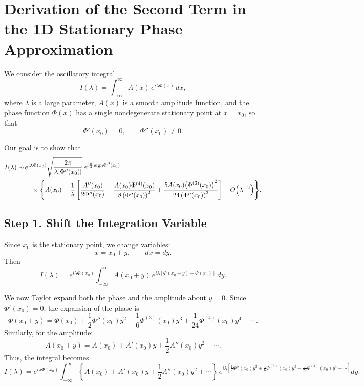 \documentclass[11pt]{article}
\begin{document}
\section*{Derivation of the Second Term in the 1D Stationary Phase Approximation}

We consider the oscillatory integral
\begin{equation}\label{I_def}
I(\lambda)=\int_{-\infty}^\infty A(x)\,e^{i\lambda\Phi(x)}\,dx,
\end{equation}
where $\lambda$ is a large parameter, $A(x)$ is a smooth amplitude function, and the phase function $\Phi(x)$ has a single nondegenerate stationary point at $x=x_0$, so that
\[
\Phi'(x_0)=0,\qquad \Phi''(x_0)\neq 0.
\]

Our goal is to show that
\begin{equation}\label{result}
\begin{split}
I(\lambda)\sim\, & e^{i\lambda\Phi(x_0)}\sqrt{\frac{2\pi}{\lambda|\Phi''(x_0)|}}\,e^{i\frac{\pi}{4}\,\text{sign}\Phi''(x_0)} \\
&\quad \times \Biggl\{ A(x_0) + \frac{1}{\lambda}\left[\frac{A''(x_0)}{2\Phi''(x_0)}
-\frac{A(x_0)\Phi^{(4)}(x_0)}{8\left(\Phi''(x_0)\right)^2}+\frac{5A(x_0)\bigl(\Phi^{(3)}(x_0)\bigr)^2}{24\left(\Phi''(x_0)\right)^3}\right] + O\Bigl(\lambda^{-2}\Bigr) \Biggr\}.
\end{split}
\end{equation}

\subsection*{Step 1. Shift the Integration Variable}

Since $x_0$ is the stationary point, we change variables:
\[
x=x_0+y,\qquad dx=dy.
\]
Then
\[
I(\lambda)=e^{i\lambda\Phi(x_0)}\int_{-\infty}^{\infty} A(x_0+y)\, e^{i\lambda\left[\Phi(x_0+y)-\Phi(x_0)\right]}\,dy.
\]

We now Taylor expand both the phase and the amplitude about $y=0$. Since $\Phi'(x_0)=0$, the expansion of the phase is
\[
\Phi(x_0+y)=\Phi(x_0)+\frac{1}{2}\Phi''(x_0)y^2+\frac{1}{6}\Phi^{(3)}(x_0)y^3+\frac{1}{24}\Phi^{(4)}(x_0)y^4+\cdots.
\]
Similarly, for the amplitude:
\[
A(x_0+y)=A(x_0)+A'(x_0)y+\frac{1}{2}A''(x_0)y^2+\cdots.
\]
Thus, the integral becomes
\[
I(\lambda)=e^{i\lambda\Phi(x_0)}\int_{-\infty}^{\infty} \left\{ A(x_0)+A'(x_0)y+\frac{1}{2}A''(x_0)y^2+\cdots \right\} \, e^{i\lambda\left[\frac{1}{2}\Phi''(x_0)y^2+\frac{1}{6}\Phi^{(3)}(x_0)y^3+\frac{1}{24}\Phi^{(4)}(x_0)y^4+\cdots\right]}dy.
\]
\end{document}
